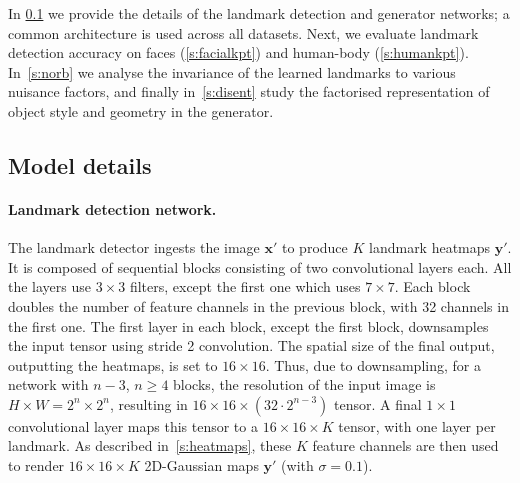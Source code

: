 \documentclass{article}
\newcommand{\bx}{\mathbf{x}}
\newcommand{\by}{\mathbf{y}}
\begin{document}
In \cref{s:details} we provide the details of the landmark detection and generator networks; a common architecture is used across all datasets. Next, we evaluate landmark detection accuracy on faces (\cref{s:facialkpt}) and human-body (\cref{s:humankpt}). In~\cref{s:norb} we analyse the invariance of the learned landmarks to various nuisance factors, and finally in~\cref{s:disent} study the factorised representation of object style and geometry in the generator.

\subsection{Model details}\label{s:details}\paragraph{Landmark detection network.}

The landmark detector ingests the image $\bx'$ to produce $K$ landmark heatmaps $\by'$. It is composed of sequential blocks consisting of two convolutional layers each. All the layers use $3{\times}3$ filters, except the first one which uses $7{\times}7$. Each block doubles the number of feature channels in the previous block, with 32 channels in the first one. The first layer in each block, except the first block, downsamples the input tensor using stride 2 convolution. The spatial size of the final output, outputting the heatmaps, is set to $16{\times}16$. Thus, due to downsampling, for a network with $n-3$, $n\geq 4$ blocks, the resolution of the input image is $H{\times}W= 2^n{\times}2^n$, resulting in $16{\times}16{\times}(32\cdot2^{n-3})$ tensor. A final $1{\times}1$ convolutional layer maps this tensor to a $16{\times}16{\times}K$ tensor, with one layer per landmark. As described in~\cref{s:heatmaps}, these $K$ feature channels are then used to render $16{\times}16{\times}K$ 2D-Gaussian maps $\by'$ (with $\sigma = 0.1$).
\end{document}
